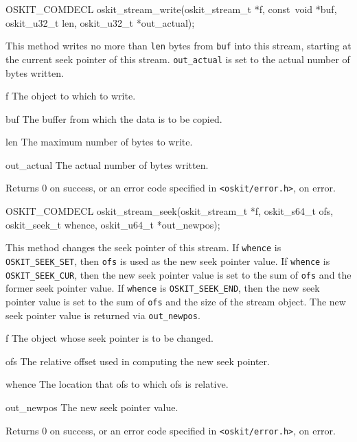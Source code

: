 \begin{apisyn}

	\funcproto OSKIT_COMDECL
	oskit_stream_write(oskit_stream_t *f, 
		          const~void *buf,
	                 oskit_u32_t len,
			 \outparam oskit_u32_t *out_actual);
\end{apisyn}
\begin{apidesc}
	This method writes no more than {\tt len} bytes from
	{\tt buf} into this stream, starting at the current
	seek pointer of this stream.  {\tt out_actual}
	is set to the actual number of bytes written.
\end{apidesc}
\begin{apiparm}
	\item[f]
		The object to which to write.
	\item[buf]
		The buffer from which the data is to be copied.
	\item[len]
		The maximum number of bytes to write.	
	\item[out_actual]
		The actual number of bytes written.
\end{apiparm}
\begin{apiret}
	Returns 0 on success, or an error code specified in
	{\tt <oskit/error.h>}, on error.
\end{apiret}


\begin{apisyn}

	\funcproto OSKIT_COMDECL
	oskit_stream_seek(oskit_stream_t *f, 
		         oskit_s64_t ofs,
	         	 oskit_seek_t whence,
			 \outparam oskit_u64_t *out_newpos);
\end{apisyn}
\begin{apidesc}
	This method changes the seek pointer of this 
	stream.  If {\tt whence} is {\tt OSKIT_SEEK_SET},
	then {\tt ofs} is used as the new seek
	pointer value.  If {\tt whence} is {\tt OSKIT_SEEK_CUR},
	then the new seek pointer value is set to the sum of
	{\tt ofs} and the former seek pointer value.  
	If {\tt whence} is  {\tt OSKIT_SEEK_END}, then the new
	seek pointer value is set to the sum of {\tt ofs}
	and the size of the stream object.  The
	new seek pointer value is returned via {\tt out_newpos}.
\end{apidesc}
\begin{apiparm}
	\item[f]
		The object whose seek pointer is to be changed.
	\item[ofs]
		The relative offset used in computing the new seek pointer.
	\item[whence]
		The location that ofs to which ofs is relative.
	\item[out_newpos]
		The new seek pointer value.
\end{apiparm}
\begin{apiret}
	Returns 0 on success, or an error code specified in
	{\tt <oskit/error.h>}, on error.
\end{apiret}



